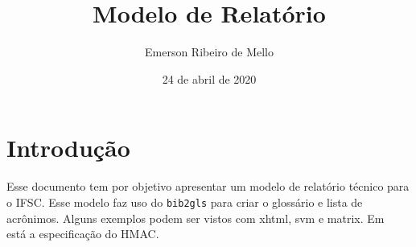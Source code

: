 \documentclass[11pt,a4paper]{ifsctech}
\title{Modelo de Relatório}
\author{Emerson Ribeiro de Mello}
\date{24 de abril de 2020}
\begin{document}
\tableofcontents%
\printunsrtglossary[type=abbreviations]
\printunsrtglossary




\chapter{Introdução}\label{cap:introducao}

Esse documento tem por objetivo apresentar um modelo de relatório técnico para o \gls{IFSC}. Esse modelo faz uso do \texttt{bib2gls} para criar o glossário e lista de acrônimos.  Alguns exemplos podem ser vistos com \gls{xhtml}, \gls{svm} e \gls{matrix}. Em~\cite{rfc2104hmac} está a especificação do \gls{HMAC}.

\printbibliography[heading=bibintoc,title={Referências}]%
\end{document}

